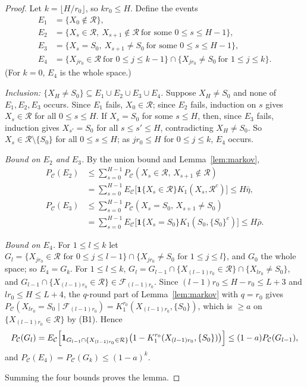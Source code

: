 \documentclass[11pt]{article}
\theoremstyle{remark}
\newcommand{\one}{\mathbf 1}
\newcommand{\R}{\mathcal R}
\newcommand{\C}{\mathcal C}
\newcommand{\Pc}{P_{\C}}
\newcommand{\Ec}{E_{\C}}
\begin{document}
\begin{proof}
Let $k=\lfloor H/r_0\rfloor$, so $kr_0\le H$. Define the events
\begin{align*}
E_1&=\{X_0\notin\R\},\\
E_2&=\{X_s\in\R,\ X_{s+1}\notin\R\ \text{for some }0\le s\le H-1\},\\
E_3&=\{X_s=S_0,\ X_{s+1}\neq S_0\ \text{for some }0\le s\le H-1\},\\
E_4&=\{X_{jr_0}\in\R\ \text{for }0\le j\le k-1\}\cap\{X_{jr_0}\neq S_0\ \text{for }1\le j\le k\}.
\end{align*}
(For $k=0$, $E_4$ is the whole space.)

\emph{Inclusion: $\{X_H\neq S_0\}\subseteq E_1\cup E_2\cup E_3\cup E_4$.}
Suppose $X_H\ne S_0$ and none of $E_1,E_2,E_3$ occurs. Since $E_1$ fails, $X_0\in\R$; since $E_2$ fails, induction on $s$ gives $X_s\in\R$ for all $0\le s\le H$. If $X_s=S_0$ for some $s\le H$, then, since $E_3$ fails, induction gives $X_{s'}=S_0$ for all $s\le s'\le H$, contradicting $X_H\neq S_0$. So $X_s\in\R\setminus\{S_0\}$ for all $0\le s\le H$; as $jr_0\le H$ for $0\le j\le k$, $E_4$ occurs.

\emph{Bound on $E_2$ and $E_3$.} By the union bound and Lemma~\ref{lem:markov},
\begin{align*}
\Pc(E_2)&\le\sum_{s=0}^{H-1}\Pc(X_s\in\R,\,X_{s+1}\notin\R)\\&=\sum_{s=0}^{H-1}\Ec\bigl[\one\{X_s\in\R\}K_1(X_s,\R^c)\bigr]\le H\bar\eta,\\
\Pc(E_3)&\le\sum_{s=0}^{H-1}\Pc(X_s=S_0,\,X_{s+1}\ne S_0)\\&=\sum_{s=0}^{H-1}\Ec\bigl[\one\{X_s=S_0\}K_1(S_0,\{S_0\}^c)\bigr]\le H\bar\rho .
\end{align*}

\emph{Bound on $E_4$.} For $1\le l\le k$ let $G_l=\{X_{jr_0}\in\R\text{ for }0\le j\le l-1\}\cap\{X_{jr_0}\ne S_0\text{ for }1\le j\le l\}$, and $G_0$ the whole space; so $E_4=G_k$. For $1\le l\le k$, $G_l=G_{l-1}\cap\{X_{(l-1)r_0}\in\R\}\cap\{X_{lr_0}\neq S_0\}$, and $G_{l-1}\cap\{X_{(l-1)r_0}\in\R\}\in\mathcal F_{(l-1)r_0}$. Since $(l-1)r_0\le H-r_0\le L+3$ and $lr_0\le H\le L+4$, the $q$-round part of Lemma~\ref{lem:markov} with $q=r_0$ gives $\Pc(X_{lr_0}=S_0\mid\mathcal F_{(l-1)r_0})=K_1^{r_0}(X_{(l-1)r_0},\{S_0\})$, which is $\ge a$ on $\{X_{(l-1)r_0}\in\R\}$ by (B1). Hence
\[
\Pc(G_l)=\Ec\Bigl[\one_{G_{l-1}\cap\{X_{(l-1)r_0}\in\R\}}\bigl(1-K_1^{r_0}(X_{(l-1)r_0},\{S_0\})\bigr)\Bigr]\le(1-a)\Pc(G_{l-1}),
\]
and $\Pc(E_4)=\Pc(G_k)\le(1-a)^k$.

Summing the four bounds proves the lemma.
\end{proof}
\end{document}
